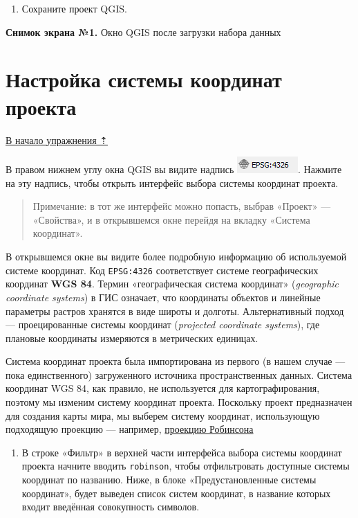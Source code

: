 \documentclass[
  12pt,
]{book}
\providecommand{\tightlist}{%
  \setlength{\itemsep}{0pt}\setlength{\parskip}{0pt}}
\begin{document}
\begin{enumerate}
\def\labelenumi{\arabic{enumi}.}
\setcounter{enumi}{8}
\tightlist
\item
  Сохраните проект QGIS.
\end{enumerate}

\textbf{Снимок экрана №1.} Окно QGIS после загрузки набора данных

\hypertarget{map-design-world-crs}{%
\section{Настройка системы координат проекта}\label{map-design-world-crs}}

\protect\hyperlink{map-design-world}{В начало упражнения ⇡}

В правом нижнем углу окна QGIS вы видите надпись \includegraphics{images/Ex01_WorldMap/EPSG4326.png}. Нажмите на эту надпись, чтобы открыть интерфейс выбора системы координат проекта.

\begin{quote}
Примечание: в тот же интерфейс можно попасть, выбрав «Проект» --- «Свойства», и в открывшемся окне перейдя на вкладку «Система координат».
\end{quote}

В открывшемся окне вы видите более подробную информацию об используемой системе координат. Код \texttt{EPSG:4326} соответствует системе географических координат \textbf{WGS 84}. Термин «географическая система координат» (\emph{geographic coordinate systems}) в ГИС означает, что координаты объектов и линейные параметры растров хранятся в виде широты и долготы. Альтернативный подход --- проецированные системы координат (\emph{projected coordinate systems}), где плановые координаты измеряются в метрических единицах.

Система координат проекта была импортирована из первого (в нашем случае --- пока единственного) загруженного источника пространственных данных. Система координат WGS 84, как правило, не используется для картографирования, поэтому мы изменим систему координат проекта. Поскольку проект предназначен для создания карты мира, мы выберем систему координат, использующую подходящую проекцию --- например, \href{https://en.wikipedia.org/wiki/Robinson_projection}{проекцию Робинсона}

\begin{enumerate}
\def\labelenumi{\arabic{enumi}.}
\tightlist
\item
  В строке «Фильтр» в верхней части интерфейса выбора системы координат проекта начните вводить \texttt{robinson}, чтобы отфильтровать доступные системы координат по названию. Ниже, в блоке «Предустановленные системы координат», будет выведен список систем координат, в название которых входит введённая совокупность символов.
\end{enumerate}
\end{document}
